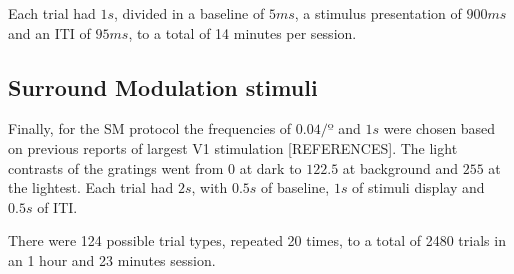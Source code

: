 Each trial had $1 s$, divided in a baseline of $5 ms$, a stimulus presentation of $900 ms$ and an ITI of $95 ms$, to a total of 14 minutes per session.

\begin{table}[H]
\begin{center}\par
{}
 \caption{Configurations regarding the tuning mapping protocol stimuli properties.}
    \vspace{-5mm}
    \label{table:tuning}
\end{center}
\end{table}

\subsection{Surround Modulation stimuli}
\label{subsec:subcsectionC}

Finally, for the SM protocol the frequencies of $0.04 /º$ and $1 s$ were chosen based on previous reports of largest V1 stimulation [REFERENCES]. The light contrasts of the gratings went from $0$ at dark to $122.5$ at background and $255$ at the lightest. Each trial had $2 s$, with $0.5 s$ of baseline, $1 s$ of stimuli display and $0.5 s$ of ITI. 

There were 124 possible trial types, repeated 20 times, to a total of 2480 trials in an 1 hour and 23 minutes session.

